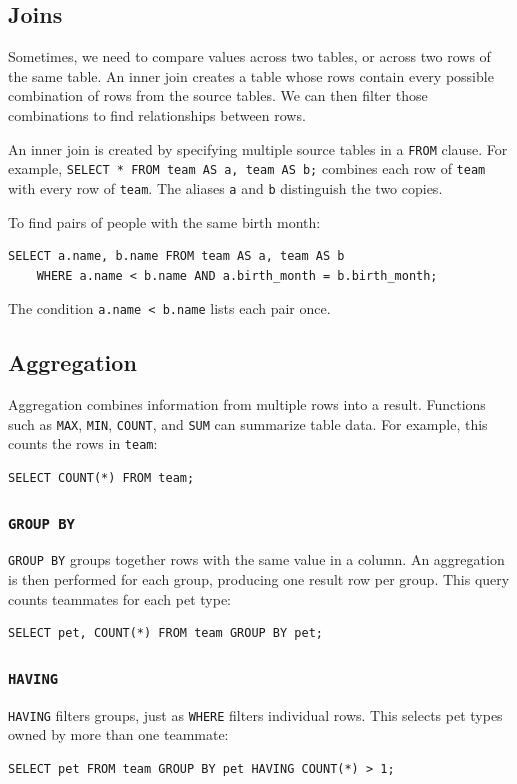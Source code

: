\subsection{Joins}
Sometimes, we need to compare values across two tables, or across two rows of the same table. An inner join creates a table whose rows contain every possible combination of rows from the source tables. We can then filter those combinations to find relationships between rows.

An inner join is created by specifying multiple source tables in a \lstinline{FROM} clause. For example, \lstinline{SELECT * FROM team AS a, team AS b;} combines each row of \lstinline{team} with every row of \lstinline{team}. The aliases \lstinline{a} and \lstinline{b} distinguish the two copies.

To find pairs of people with the same birth month:
\begin{lstlisting}
SELECT a.name, b.name FROM team AS a, team AS b
    WHERE a.name < b.name AND a.birth_month = b.birth_month;
\end{lstlisting}
The condition \lstinline{a.name < b.name} lists each pair once.

\subsection{Aggregation}
Aggregation combines information from multiple rows into a result. Functions such as \lstinline{MAX}, \lstinline{MIN}, \lstinline{COUNT}, and \lstinline{SUM} can summarize table data. For example, this counts the rows in \lstinline{team}:
\begin{lstlisting}
SELECT COUNT(*) FROM team;
\end{lstlisting}

\subsubsection{\lstinline{GROUP BY}}
\lstinline{GROUP BY} groups together rows with the same value in a column. An aggregation is then performed for each group, producing one result row per group. This query counts teammates for each pet type:
\begin{lstlisting}
SELECT pet, COUNT(*) FROM team GROUP BY pet;
\end{lstlisting}

\subsubsection{\lstinline{HAVING}}
\lstinline{HAVING} filters groups, just as \lstinline{WHERE} filters individual rows. This selects pet types owned by more than one teammate:
\begin{lstlisting}
SELECT pet FROM team GROUP BY pet HAVING COUNT(*) > 1;
\end{lstlisting}
